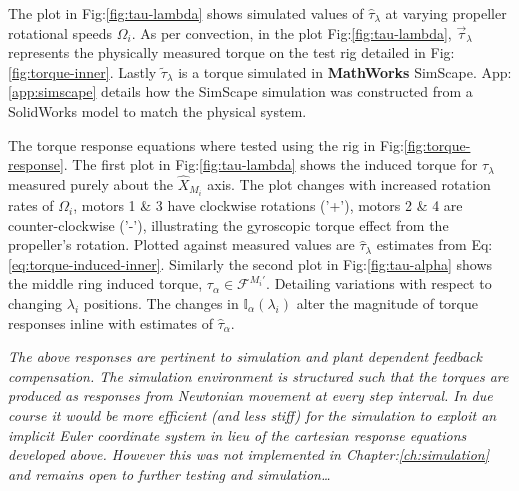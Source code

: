 \par
The plot in Fig:\ref{fig:tau-lambda} shows simulated values of $\hat{\tau}_\lambda$ at varying propeller rotational speeds $\Omega_i$. As per convection, in the plot Fig:\ref{fig:tau-lambda}, $\vec{\tau}_\lambda$ represents the physically measured torque on the test rig detailed in Fig:\ref{fig:torque-inner}. Lastly $\tilde{\tau}_\lambda$ is a torque simulated in \textbf{MathWorks} SimScape. App:\ref{app:simscape} details how the SimScape simulation was constructed from a SolidWorks model to match the physical system.
\par
The torque response equations where tested using the rig in Fig:\ref{fig:torque-response}. The first plot in Fig:\ref{fig:tau-lambda} shows the induced torque for $\tau_\lambda$ measured purely about the $\hat{X}_{M_i}$ axis. The plot changes with increased rotation rates of $\Omega_i$, motors 1 \& 3 have clockwise rotations ('+'), motors 2 \& 4 are counter-clockwise ('-'), illustrating the gyroscopic torque effect from the propeller's rotation. Plotted against measured values are $\hat{\tau}_\lambda$ estimates from Eq:\ref{eq:torque-induced-inner}. Similarly the second plot in Fig:\ref{fig:tau-alpha} shows the middle ring induced torque, $\tau_\alpha\in\mathcal{F}^{M_i'}$. Detailing variations with respect to changing $\lambda_i$ positions. The changes in $\mathbb{I}_\alpha(\lambda_i)$ alter the magnitude of torque responses inline with estimates of $\hat{\tau}_\alpha$.
\par
\emph{\color{Gray}The above responses are pertinent to simulation and plant dependent feedback compensation. The simulation environment is structured such that the torques are produced as responses from Newtonian movement at every step interval. In due course it would be more efficient (and less stiff) for the simulation to exploit an implicit Euler\cite{physicallybased,multibodydynamics} coordinate system in lieu of the cartesian response equations developed above. However this was not implemented in Chapter:\ref{ch:simulation} and remains open to further testing and simulation\ldots}
